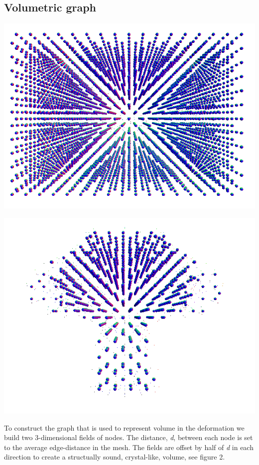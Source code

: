\documentclass[10pt]{article}
\newenvironment{Figure}
  {\par\medskip\noindent\minipage{\linewidth}}
  {\endminipage\par\medskip}
\begin{document}
\begin{multicols}{2}
\subsection{Volumetric graph}
\begin{Figure}
	\centering
	\includegraphics[width=\linewidth]{graph1.png}
\end{Figure}
\begin{Figure}
	\centering
	\includegraphics[width=\linewidth]{graph2.png}
\end{Figure}
To construct the graph that is used to represent volume in the deformation we build two 3-dimensional fields of nodes. The distance, \textit{d}, between each node is set to the average edge-distance in the mesh. The fields are offset by half of \textit{d} in each direction to create a structually sound, crystal-like, volume, see figure 2.
 

\end{multicols}
\end{document}

